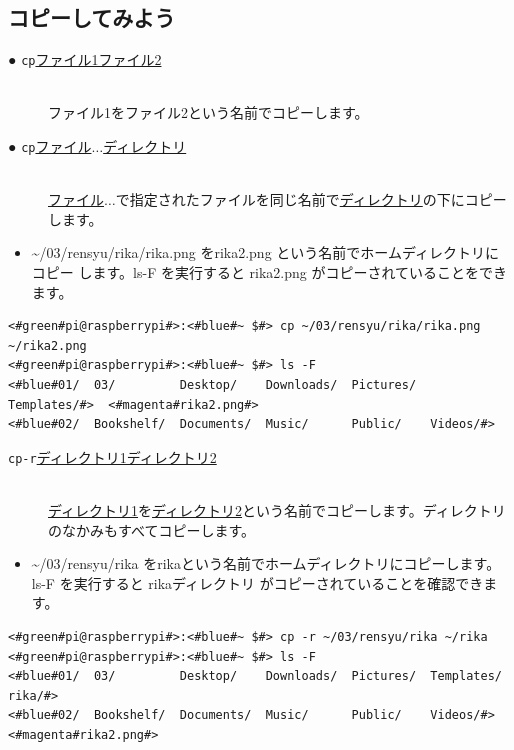\documentclass[text03.tex]{subfiles}
\begin{document}
\subsection{コピーしてみよう}
\begin{description}
    \item[● \texttt{cp}\textvisiblespace \underline{ファイル1}\textvisiblespace \underline{ファイル2}]\mbox{}\\
    ファイル1をファイル2という名前でコピーします。
    \item[● \texttt{cp}\textvisiblespace \underline{ファイル}$\ldots$\textvisiblespace \underline{ディレクトリ}]\mbox{}\\
    \underline{ファイル}$\ldots$で指定されたファイルを同じ名前で\underline{ディレクトリ}の下にコピーします。
\end{description}
\begin{itemize}
\item[<例>]\textasciitilde /03/rensyu/rika/rika.png をrika2.png という名前でホームディレクトリにコピー
します。ls\textvisiblespace -F を実行すると rika2.png がコピーされていることをできます。
\end{itemize}
\begin{lstlisting}[caption=cpの例, label=cp]
<#green#pi@raspberrypi#>:<#blue#~ $#> cp ~/03/rensyu/rika/rika.png ~/rika2.png
<#green#pi@raspberrypi#>:<#blue#~ $#> ls -F
<#blue#01/  03/         Desktop/    Downloads/  Pictures/  Templates/#>  <#magenta#rika2.png#>
<#blue#02/  Bookshelf/  Documents/  Music/      Public/    Videos/#>
\end{lstlisting}
\begin{description}
\item[\texttt{cp}\textvisiblespace \texttt{-r}\textvisiblespace \underline{ディレクトリ1}\textvisiblespace \underline{ディレクトリ2}]\mbox{}\\
\underline{ディレクトリ1}を\underline{ディレクトリ2}という名前でコピーします。ディレクトリのなかみもすべてコピーします。
\end{description}
\begin{itemize}
\item[<例>]\textasciitilde /03/rensyu/rika をrikaという名前でホームディレクトリにコピーします。ls\textvisiblespace -F を実行すると rikaディレクトリ がコピーされていることを確認できます。
\end{itemize}
\begin{lstlisting}[caption=cp -rの例, label=cp-R]
<#green#pi@raspberrypi#>:<#blue#~ $#> cp -r ~/03/rensyu/rika ~/rika
<#green#pi@raspberrypi#>:<#blue#~ $#> ls -F
<#blue#01/  03/         Desktop/    Downloads/  Pictures/  Templates/   rika/#>
<#blue#02/  Bookshelf/  Documents/  Music/      Public/    Videos/#>      <#magenta#rika2.png#>
\end{lstlisting}
\end{document}
